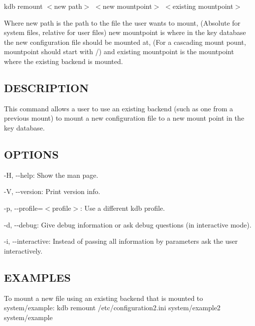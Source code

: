 {\ttfamily kdb remount $<$new path$>$ $<$new mountpoint$>$ $<$existing mountpoint$>$}

Where {\ttfamily new path} is the path to the file the user wants to mount, (Absolute for system files, relative for user files) {\ttfamily new mountpoint} is where in the key database the new configuration file should be mounted at, (For a cascading mount pount, {\ttfamily mountpoint} should start with {\ttfamily /}) and {\ttfamily existing mountpoint} is the mountpoint where the existing backend is mounted.

\subsection*{D\+E\+S\+C\+R\+I\+P\+T\+I\+O\+N}

This command allows a user to use an existing backend (such as one from a previous mount) to mount a new configuration file to a new mount point in the key database.

\subsection*{O\+P\+T\+I\+O\+N\+S}


\begin{DoxyItemize}
\item {\ttfamily -\/\+H}, {\ttfamily -\/-\/help}\+: Show the man page.
\item {\ttfamily -\/\+V}, {\ttfamily -\/-\/version}\+: Print version info.
\item {\ttfamily -\/p}, {\ttfamily -\/-\/profile}=$<$profile$>$\+: Use a different kdb profile.
\item {\ttfamily -\/d}, {\ttfamily -\/-\/debug}\+: Give debug information or ask debug questions (in interactive mode).
\item {\ttfamily -\/i}, {\ttfamily -\/-\/interactive}\+: Instead of passing all information by parameters ask the user interactively.
\end{DoxyItemize}

\subsection*{E\+X\+A\+M\+P\+L\+E\+S}

To mount a new file using an existing backend that is mounted to {\ttfamily system/example}\+: {\ttfamily kdb remount /etc/configuration2.ini system/example2 system/example} 